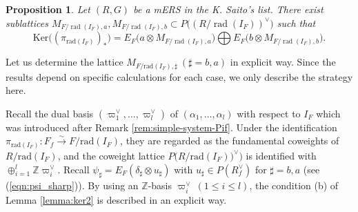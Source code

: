 \documentclass[11pt]{amsart}
\newtheorem{prop}[thm]{Proposition}%
\newcommand{\rad}{\operatorname{rad}}
\begin{document}
{\begin{prop}\label{prop:ker}
Let $(R,G)$ be a mERS in the K. Saito's list.  There
exist sublattices $M_{F/\rad(I_F),a},M_{F/\rad(I_F),b}\subset 
P\big((R/\rad(I_F))^{\vee}\big)$ 
such that
\[\mathrm{Ker}\bigl((\pi_{\mathrm{rad}(I_F)})_* \bigr)=
E_F\big(a\otimes M_{F/\rad(I_F),a}\big)
\bigoplus E_F\big(b\otimes M_{F/\rad(I_F),b}\bigr).\]
\end{prop}

Let us determine the lattice $M_{F/\mathrm{rad}(I_F),\sharp}\ 
(\sharp=b,a)$ in explicit way. Since the results depend on specific calculations for each 
case, we only describe the strategy here. 

Recall the dual basis 
$(\varpi_1^{\vee},\ldots,\varpi_l^{\vee})$ of $(\alpha_1,\ldots,\alpha_l)$ with respect
to $I_F$ which was introduced after Remark \ref{rem:simple-system-Pif}.
Under the identification 
$\pi_{\mathrm{rad}(I_F)}:F_f\overset{\sim}{\to} F/\mathrm{rad}(I_F)$, 
they are regarded as the fundamental coweights of $R/\mathrm{rad}(I_F)$, and 
the coweight lattice $P\big(R/\mathrm{rad}(I_F))^{\vee}\big)$ is identified with 
$\oplus_{i=1}^l\mathbb{Z} \varpi_i^{\vee}$. 
Recall $\psi_{\sharp}=E_F(\delta_{\sharp}\otimes u_{\sharp})$ with
$u_{\sharp}\in P(R_f^{\vee})$ for $\sharp=b,a$ (see (\ref{eqn:psi_sharp})). By  using
an $\mathbb{Z}$-basis $\varpi_i^{\vee}\ (1\leq i\leq l)$, the condition (b) of Lemma
\ref{lemma:ker2} is described in an explicit way. }\\
\end{document}
